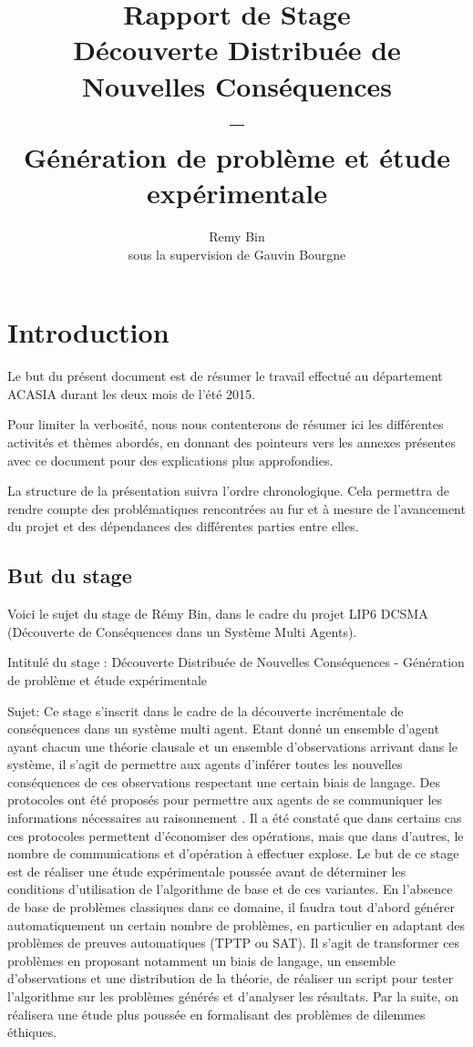 \documentclass{article}
\title{Rapport de Stage \\
Découverte Distribuée de Nouvelles Conséquences\\
--\\
Génération de problème et étude expérimentale}
\author{Remy Bin\\
sous la supervision de Gauvin Bourgne}
\begin{document}
\maketitle

\newpage

\section{Introduction}
Le but du présent document est de résumer le travail effectué au département ACASIA durant les deux mois de l'été 2015.

Pour limiter la verbosité, nous nous contenterons de résumer ici les différentes activités et thèmes abordés, en donnant des pointeurs vers les annexes présentes avec ce document pour des explications plus approfondies.

La structure de la présentation suivra l'ordre chronologique.
Cela permettra de rendre compte des problématiques rencontrées au fur et \`a mesure de l'avancement du projet et des dépendances des différentes parties entre elles.


\subsection{But du stage}


Voici le sujet du stage de Rémy Bin, dans le cadre du projet LIP6 DCSMA (Découverte de Conséquences dans un Système Multi Agents).

Intitulé du stage : Découverte Distribuée de Nouvelles Conséquences - Génération de problème et étude expérimentale

Sujet: 
Ce stage s'inscrit dans le cadre de la découverte incrémentale de conséquences dans un système multi agent. Etant donné un ensemble d'agent ayant chacun une théorie clausale et un ensemble d'observations arrivant dans le système, il s'agit de permettre aux agents d'inférer toutes les nouvelles conséquences de ces observations respectant une certain biais de langage. Des protocoles ont été proposés pour permettre aux agents de se communiquer les informations nécessaires au raisonnement \cite{Bourgne2012}. Il a été constaté que dans certains cas ces protocoles permettent d'économiser des opérations, mais que dans d'autres, le nombre de communications et d'opération \`a effectuer explose.
Le but de ce stage est de réaliser une étude expérimentale poussée avant de déterminer les conditions d'utilisation de l'algorithme de base et de ces variantes. En l'absence de base de problèmes classiques dans ce domaine, il faudra tout d'abord générer automatiquement un certain nombre de problèmes, en particulier en adaptant des problèmes de preuves automatiques (TPTP ou SAT). Il s'agit de transformer ces problèmes en proposant notamment un biais de langage, un ensemble d'observations et une distribution de la théorie, de réaliser un script pour tester l'algorithme sur les problèmes générés et d'analyser les résultats.
Par la suite, on réalisera une étude plus poussée en formalisant des problèmes de dilemmes éthiques.
\end{document}
